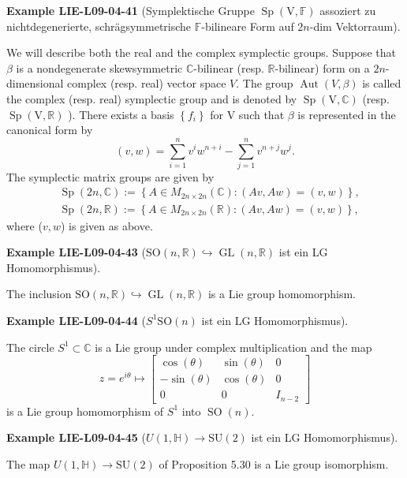 \documentclass[10pt, letterpaper]{article}
\newcommand{\CustomHeading}[3]{%
  \par\medskip\noindent%
  \textbf{#1 #2} \textnormal{(#3)}.\enskip%
}
\newenvironment{EXA}[2]{\CustomHeading{Example}{#1}{#2}}{}
\begin{document}
\begin{EXA}{LIE-L09-04-41}{Symplektische Gruppe $\operatorname{Sp}(\mathrm{V}, \mathbb{F})$ assoziert zu nichtdegenerierte, schrägsymmetrische $\mathbb{F}$-bilineare Form auf $2n$-dim Vektorraum}
We will describe both the real and the complex symplectic groups. Suppose that $\beta$ is a nondegenerate skewsymmetric $\mathbb{C}$-bilinear (resp. $\mathbb{R}$-bilinear) form on a $2 n$-dimensional complex (resp. real) vector space $V$. The group $\operatorname{Aut}(V, \beta)$ is called the complex (resp. real) symplectic group and is denoted by $\operatorname{Sp}(\mathrm{V}, \mathbb{C})$ (resp. $\operatorname{Sp}(\mathrm{V}, \mathbb{R})$ ). There exists a basis $\left\{f_{i}\right\}$ for V such that $\beta$ is represented in the canonical form by
$$
(v, w)=\sum_{i=1}^{n} v^{i} w^{n+i}-\sum_{j=1}^{n} v^{n+j} w^{j} .
$$
The symplectic matrix groups are given by
$$
\begin{aligned}
& \operatorname{Sp}(2 n, \mathbb{C}):=\left\{A \in M_{2 n \times 2 n}(\mathbb{C}):(A v, A w)=(v, w)\right\}, \\
& \operatorname{Sp}(2 n, \mathbb{R}):=\left\{A \in M_{2 n \times 2 n}(\mathbb{R}):(A v, A w)=(v, w)\right\},
\end{aligned}
$$
where ($v,w$) is given as above.
\end{EXA}

\begin{EXA}{LIE-L09-04-43}{$\mathrm{SO}(n, \mathbb{R}) \hookrightarrow \operatorname{GL}(n, \mathbb{R})$ ist ein LG Homomorphismus}
The inclusion $\mathrm{SO}(n, \mathbb{R}) \hookrightarrow \operatorname{GL}(n, \mathbb{R})$ is a Lie group homomorphism.
\end{EXA}

\begin{EXA}{LIE-L09-04-44}{$S^1 \mathrm{SO}(n)$ ist ein LG Homomorphismus}
The circle $S^{1} \subset \mathbb{C}$ is a Lie group under complex multiplication and the map
$$
z=e^{i \theta} \mapsto\left[\begin{array}{ccc}
\cos (\theta) & \sin (\theta) & 0 \\
-\sin (\theta) & \cos (\theta) & 0 \\
0 & 0 & I_{n-2}
\end{array}\right]
$$
is a Lie group homomorphism of $S^{1}$ into $\operatorname{SO}(n)$.
\end{EXA}

\begin{EXA}{LIE-L09-04-45}{$U(1, \mathbb{H}) \rightarrow \mathrm{SU}(2)$ ist ein LG Homomorphismus}
The map $U(1, \mathbb{H}) \rightarrow \mathrm{SU}(2)$ of Proposition 5.30 is a Lie group isomorphism.
\end{EXA}
\end{document}
